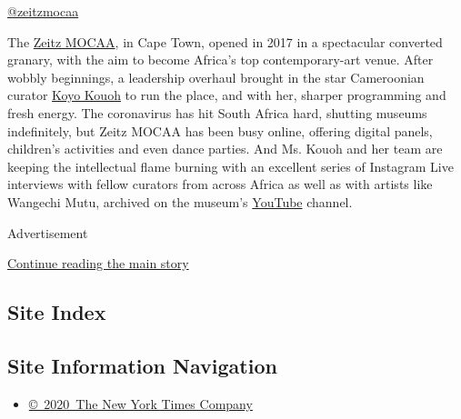\href{https://www.instagram.com/zeitzmocaa/}{@zeitzmocaa}

The \href{https://zeitzmocaa.museum/}{Zeitz MOCAA}, in Cape Town, opened
in 2017 in a spectacular converted granary, with the aim to become
Africa's top contemporary-art venue. After wobbly beginnings, a
leadership overhaul brought in the star Cameroonian curator
\href{https://www.instagram.com/madamekoyo/}{Koyo Kouoh} to run the
place, and with her, sharper programming and fresh energy. The
coronavirus has hit South Africa hard, shutting museums indefinitely,
but Zeitz MOCAA has been busy online, offering digital panels,
children's activities and even dance parties. And Ms. Kouoh and her team
are keeping the intellectual flame burning with an excellent series of
Instagram Live interviews with fellow curators from across Africa as
well as with artists like Wangechi Mutu, archived on the museum's
\href{https://www.youtube.com/channel/UCDJltdsHMhBhgl_y6MMEcyQ/videos}{YouTube}
channel.

Advertisement

\protect\hyperlink{after-bottom}{Continue reading the main story}

\hypertarget{site-index}{%
\subsection{Site Index}\label{site-index}}

\hypertarget{site-information-navigation}{%
\subsection{Site Information
Navigation}\label{site-information-navigation}}

\begin{itemize}
\tightlist
\item
  \href{https://help.nytimes3xbfgragh.onion/hc/en-us/articles/115014792127-Copyright-notice}{©~2020~The
  New York Times Company}
\end{itemize}


